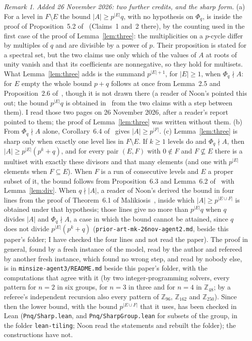 \documentclass[11pt,a4paper]{amsart}
\theoremstyle{definition}
\theoremstyle{remark}
\newtheorem{remark}[theorem]{Remark}
\newcommand{\Z}{\mathbb{Z}}
\newcommand{\lean}[1]{\texttt{#1}}
\begin{document}
\begin{remark}
\emph{Added 26 November 2026: two further credits, and the sharp form.}
(a) For a level in $F\setminus E$ the bound $|A|\ge p^{|E|}q$, with no hypothesis on $\Phi_q$, is inside the
proof of Proposition~5.2 of~\cite{MK} (Claims~1 and~2 there), by the counting used in the first case of the
proof of Lemma~\ref{lem:three}: the multiplicities on a $p$-cycle differ by multiples of $q$ and are divisible
by a power of $p$. Their proposition is stated for a spectral set, but the two claims use only which of the
values of $A$ at roots of unity vanish and that its coefficients are nonnegative, so they hold for multisets. What Lemma~\ref{lem:three} adds is the summand $p^{|E|+1}$, for $|E|\ge1$, when
$\Phi_q\nmid A$: for $E$ empty the whole bound $p+q$ follows at once from Lemma~2.5 and Proposition~2.6 of~\cite{MK}, though it is not
drawn there (a reader of Noon's pointed this out; the bound $p^{|E|}q$ is obtained in~\cite{MK} from the two claims with a step between them). I read those two pages on 26 November 2026, after a reader's report pointed to them; the proof
of Lemma~\ref{lem:three} was written without them.
(b) From $\Phi_q\nmid A$ alone, Corollary~6.4 of~\cite{LaM} gives $|A|\ge p^{|F|}$.
(c) Lemma~\ref{lem:three} is sharp only when exactly one level lies in $F\setminus E$. If $k\ge 1$ levels do
and $\Phi_q\nmid A$, then $|A|\ge p^{|E|}(p^{k}+q)$, and for every pair $(E,F)$ with $0\notin F$ and $F\not\subseteq E$ there is a
multiset with exactly these divisors and that many elements (and one with $p^{|E|}$ elements when $F\subseteq E$). When $F$ is a run of consecutive levels and $E$
a proper subset of it, the bound follows from Proposition~6.3 and Lemma~6.2 of~\cite{KLaMS} with Lemma~\ref{lem:div}. When $q\nmid|A|$, a reader of Noon's derived the
bound in four lines from the proof of Theorem~6.1 of Malikiosis~\cite{Mal}, inside which $|A|\ge p^{|E\cup F|}$ is obtained under that
hypothesis; those lines give no more than $p^{|E|}q$ when $q$ divides $|A|$ and $\Phi_q\nmid A$, a case in which the bound cannot be
attained, since $q$ does not divide $p^{|E|}(p^k+q)$ (\texttt{prior-art-mk-26nov-agent2.md}, beside this paper's folder; I have checked the four lines and not read the paper). The proof in
general, found by a fresh instance of the model, read by the author and refereed by another fresh instance, which found
no wrong step, and read by nobody else, is in
\texttt{minsize-agent3/README.md} beside this paper's folder, with the computations that agree with it
(by two integer-programming solvers, every pattern for $n=2$ in six groups, for $n=3$ in three and for $n=4$ in
$\Z_{48}$; by a referee's independent recursion also every pattern of $\Z_{96}$, $\Z_{162}$ and $\Z_{250}$). Since then the lower bound, with the bound $p^{|E\cup F|}$ that it uses, has been checked in Lean
(\lean{Pnq/Sharp.lean}, and \lean{Pnq/SharpGroup.lean} for subsets of the group, in the folder \lean{lean-tiling};
Noon read the statements and rebuilt the folder); the constructions have not.
\end{remark}
\end{document}
